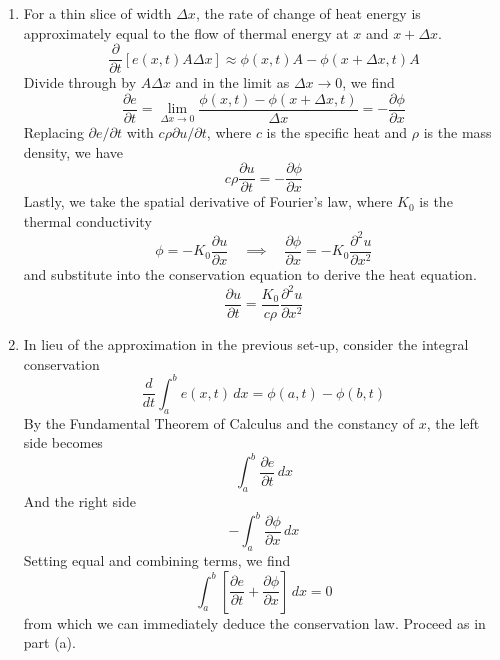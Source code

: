 \documentclass[a4paper]{article}
\begin{document}

\begin{enumerate}[label=(\alph*)]
	\item For a thin slice of width \( \Delta x \), the rate of change of heat energy is approximately equal to the flow of thermal energy at \( x \) and \( x + \Delta x \).
	\[
		\frac{\partial }{\partial t} \!\left[ e \!\left( x,t \right)A \Delta x \right] \approx \phi \!\left( x, t \right)A - \phi \!\left( x + \Delta x, t \right)A
	\]
	Divide through by \( A \Delta x \) and in the limit as \( \Delta x \rightarrow 0 \), we find
	\[
		\frac{\partial e}{\partial t} = \lim\limits_{\Delta x \to 0} \frac{\phi \!\left( x, t \right) - \phi \!\left( x + \Delta x, t \right)}{\Delta x} = -\frac{\partial \phi}{\partial x}
	\]
	Replacing \( \partial e / \partial t \) with \( c \rho \partial u / \partial t \), where \( c \) is the specific heat and \( \rho \) is the mass density, we have
	\[
		c \rho \frac{\partial u}{\partial t} = -\frac{\partial \phi}{\partial x} 
	\]
	Lastly, we take the spatial derivative of Fourier's law, where \( K_{0} \) is the thermal conductivity
	\[
		\phi = -K_{0}\frac{\partial u}{\partial x} \quad \implies \quad \frac{\partial \phi}{\partial x} = -K_{0}\frac{\partial^{2}u}{\partial x^{2}} 
	\]
	and substitute into the conservation equation to derive the heat equation.
	\[
		\frac{\partial u}{\partial t} = \frac{K_{0}}{c \rho}\frac{\partial^{2}u}{\partial x^{2}} 
	\]
	\item In lieu of the approximation in the previous set-up, consider the integral conservation
	\[
		\frac{d }{d t}\int^{b}_{a} e \!\left( x,t \right) \, dx = \phi \!\left( a,t \right) - \phi \!\left( b,t \right)
	\]
	By the Fundamental Theorem of Calculus and the constancy of \( x \), the left side becomes
	\[
		\int^{b}_{a} \frac{\partial e}{\partial t} \, dx  
	\]
	And the right side
	\[
		-\int^{b}_{a} \frac{\partial \phi}{\partial x} \, dx  
	\]
	Setting equal and combining terms, we find
	\[
		\int^{b}_{a} \!\left[ \frac{\partial e}{\partial t} + \frac{\partial \phi}{\partial x} \right] \, dx = 0
	\]
	from which we can immediately deduce the conservation law. Proceed as in part (a).
\end{enumerate}
\end{document}
